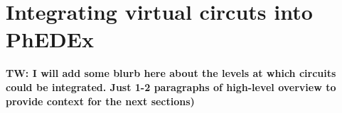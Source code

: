 \section{Integrating virtual circuts into PhEDEx}
\textbf{TW: I will add some blurb here about the levels at which circuits could be integrated. Just 1-2 paragraphs of high-level overview to provide context for the next sections)}

